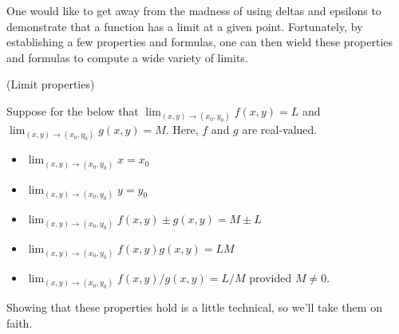\documentclass{article}
\begin{document}
One would like to get away from the madness of using deltas and epsilons to demonstrate that a function
has a limit at a given point. Fortunately, by establishing a few properties and formulas, one can then wield
these properties and formulas to compute a wide variety of limits.

\begin{proposition} (Limit properties)


Suppose for the below that $\lim_{(x,y) \to (x_0,y_0)} f(x,y) = L$ and $\lim_{(x,y) \to (x_0,y_0)} g(x,y) = M$. Here,
$f$ and $g$ are real-valued.
    \begin{itemize}
        \item $\lim_{(x,y) \to (x_0,y_0)} x = x_0$ 
        \item $\lim_{(x,y) \to (x_0,y_0)} y = y_0$
        \item $\lim_{(x,y) \to (x_0,y_0)} f(x,y) \pm g(x,y) = M \pm L$
        \item $\lim_{(x,y) \to (x_0,y_0)} f(x,y)g(x,y) = LM$
        \item $\lim_{(x,y) \to (x_0,y_0)} f(x,y)/g(x,y) = L/M$ provided $M\neq 0$.
    \end{itemize}
\end{proposition}

Showing that these properties hold is a little technical, so we'll take them on faith.
\end{document}
